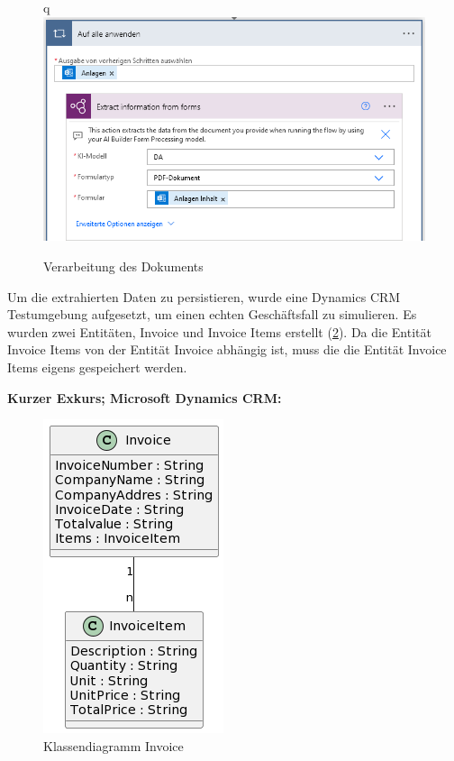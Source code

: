 \begin{figure}[H]q
    \centering
    \includegraphics[scale=0.8]{sections/cloud-computing/images/power-automate-flow/ai-model-in-use.png}
    \caption{Verarbeitung des Dokuments}
    \label{fig:ai-model-in-use}
\end{figure}

Um die extrahierten Daten zu persistieren, wurde eine Dynamics CRM Testumgebung aufgesetzt, um einen echten Geschäftsfall zu simulieren. Es wurden zwei Entitäten, Invoice und Invoice Items erstellt (\ref{fig:class-diagram}). Da die Entität Invoice Items von der Entität Invoice abhängig ist, muss die die Entität Invoice Items eigens gespeichert werden.

\textbf{Kurzer Exkurs; Microsoft Dynamics CRM:}


\begin{figure}[h]
    \centering
    \includegraphics[scale=0.5]{sections/cloud-computing/images/power-automate-flow/cld.png}
    \caption{Klassendiagramm Invoice}
    \label{fig:class-diagram}
\end{figure}

